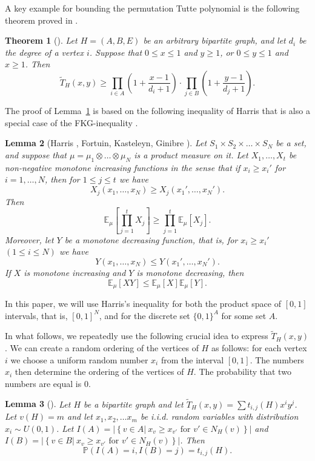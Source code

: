 \documentclass[12pt,a4paper]{amsart}
\numberwithin{equation}{section}
\theoremstyle{plain}
\newtheorem{Th}{Theorem}[section]
\newtheorem{Lemma}[Th]{Lemma}
\theoremstyle{definition}
\newcommand{\1}{\textbf{1}}
\newcommand{\E}{\mathbb{E}}
\begin{document}
A key example for bounding the permutation Tutte polynomial is the following theorem proved in \cite{beke2024permutation}. 

\begin{Th}[\cite{beke2024permutation}] \label{lower-bound}
Let $H=(A,B,E)$ be an arbitrary bipartite graph, and let $d_i$ be the degree of a vertex $i$. Suppose that $0\leqslant x\leqslant 1$ and $y\geqslant 1$, or $0\leqslant   y\leqslant 1$ and $x\geqslant 1$. Then
$$\widetilde{T}_H(x,y)\geqslant \prod_{i\in A}\left(1+\frac{x-1}{d_i+1}\right) \cdot \prod_{j\in B}\left(1+\frac{y-1}{d_j+1}\right).$$
\end{Th}

The proof of Lemma~\ref{lower-bound} is based on the following inequality of Harris \cite{harris1960lower} that is also a special case of the FKG-inequality \cite{fortuin1971correlation}.



\begin{Lemma}[Harris \cite{harris1960lower}, Fortuin, Kasteleyn, Ginibre \cite{fortuin1971correlation}] \label{FKG-inequality}
Let $S_1\times S_2\times \dots \times S_N$ be a set, and suppose that $\mu=\mu_1\otimes \dots \otimes \mu_N$ is a product measure on it. Let $X_1,\dots ,X_t$ be non-negative monotone increasing functions in the sense that if $x_i\geqslant x_i'$ for $i=1,\dots ,N$, then for $1\leqslant   j\leqslant   t$ we have
$$X_j(x_1,\dots ,x_N)\geqslant X_j(x_1',\dots ,x_N').$$
Then
$$\E_{\mu}\left[\prod_{j=1}^tX_j\right]\geqslant \prod_{j=1}^t\E_{\mu}[X_j].$$
Moreover, let $Y$ be a monotone decreasing function, that is, for $x_i\geqslant x_i'$ $(1\leqslant i\leqslant N)$ we have
$$Y(x_1,\dots ,x_N)\leqslant Y(x_1',\dots ,x_N').$$
If $X$ is monotone increasing and $Y$ is monotone decreasing, then
$$\E_{\mu}[XY]\leqslant \E_{\mu}[X]\E_{\mu}[Y].$$
\end{Lemma}

In this paper, we will use Harris's inequality for both the product space of $[0,1]$ intervals, that is, $[0,1]^N$, and for the discrete set $\{0,1\}^A$ for some set $A$. 

In what follows, we repeatedly use the following crucial idea to express $\widetilde{T}_H(x,y)$. We can create a random ordering of the vertices of $H$ as follows: for each vertex $i$ we choose a uniform random number $x_i$ from the interval $[0,1]$. The numbers $x_i$ then determine the ordering of the vertices of $H$. The probability that two numbers are equal is $0$.

 \begin{Lemma}[\cite{beke2024permutation}]\label{vlsz}
Let $H$ be a bipartite graph and let $\widetilde{T}_H(x,y)=\sum t_{i,j}(H)x^iy^j$. Let $v(H)=m$ and let $x_1, x_2, \dots x_m$ be i.i.d. random variables with distribution $x_i\sim U(0,1)$. Let $I(A)=\left|\left\{v\in A |\  x_v\ge x_{v'} \text{ for } v'\in N_H(v)\right\}\right|$ and  $I(B)=\left|\left\{v\in B |\ x_v\ge x_{v'} \text{ for } v'\in N_H(v)\right\}\right|$. Then
$$\mathbb{P}\left(I(A)=i, I(B)=j\right)=t_{i,j}(H).$$
\end{Lemma}
\end{document}

